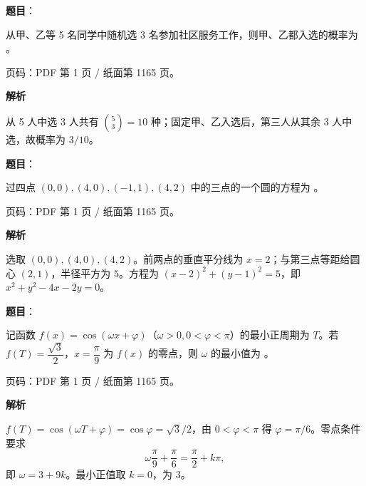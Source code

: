 \begin{answer}

\textbf{题目}：

从甲、乙等 5 名同学中随机选 3 名参加社区服务工作，则甲、乙都入选的概率为 \gkblank{}。

\begin{gktip}
页码：PDF 第 1 页 / 纸面第 1165 页。
\end{gktip}

\textbf{解析}

从 5 人中选 3 人共有 $\binom53=10$ 种；固定甲、乙入选后，第三人从其余 3 人中选，故概率为 $3/10$。


\end{answer}
\begin{answer}

\textbf{题目}：

过四点 $(0,0),(4,0),(-1,1),(4,2)$ 中的三点的一个圆的方程为 \gkblank{}。

\begin{gktip}
页码：PDF 第 1 页 / 纸面第 1165 页。
\end{gktip}

\textbf{解析}

选取 $(0,0),(4,0),(4,2)$。前两点的垂直平分线为 $x=2$；与第三点等距给圆心 $(2,1)$，半径平方为 $5$。方程为 $(x-2)^2+(y-1)^2=5$，即 $x^2+y^2-4x-2y=0$。


\end{answer}
\begin{answer}

\textbf{题目}：

记函数 $f(x)=\cos(\omega x+\varphi)$（$\omega>0,0<\varphi<\pi$）的最小正周期为 $T$。若 $f(T)=\dfrac{\sqrt3}{2}$，$x=\dfrac\pi9$ 为 $f(x)$ 的零点，则 $\omega$ 的最小值为 \gkblank{}。

\begin{gktip}
页码：PDF 第 1 页 / 纸面第 1165 页。
\end{gktip}

\textbf{解析}

$f(T)=\cos(\omega T+\varphi)=\cos\varphi=\sqrt3/2$，由 $0<\varphi<\pi$ 得 $\varphi=\pi/6$。零点条件要求
\nopagebreak[4]
\[
\omega\frac\pi9+\frac\pi6=\frac\pi2+k\pi,
\]
即 $\omega=3+9k$。最小正值取 $k=0$，为 $3$。


\end{answer}
